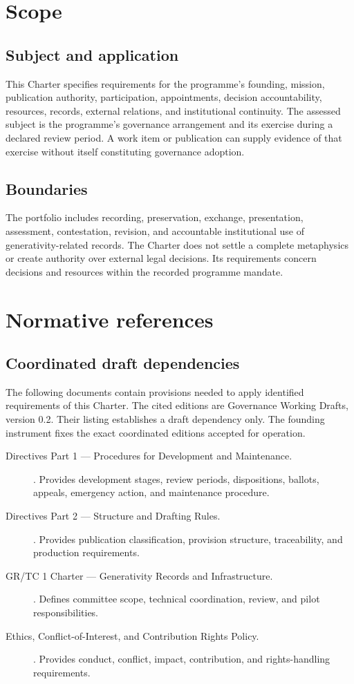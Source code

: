 \documentclass[11pt,a4paper]{article}
\begin{document}
\GSPmainmatter
\section{Scope}
\subsection{Subject and application}
This Charter specifies requirements for the programme's founding, mission, publication authority, participation, appointments, decision accountability, resources, records, external relations, and institutional continuity. The assessed subject is the programme's governance arrangement and its exercise during a declared review period. A work item or publication can supply evidence of that exercise without itself constituting governance adoption.


\subsection{Boundaries}
The portfolio includes recording, preservation, exchange, presentation, assessment, contestation, revision, and accountable institutional use of generativity-related records. The Charter does not settle a complete metaphysics or create authority over external legal decisions. Its requirements concern decisions and resources within the recorded programme mandate.


\section{Normative references}
\subsection{Coordinated draft dependencies}
The following documents contain provisions needed to apply identified requirements of this Charter. The cited editions are Governance Working Drafts, version 0.2. Their listing establishes a draft dependency only. The founding instrument fixes the exact coordinated editions accepted for operation.

\begin{description}
\item[Directives Part 1 --- Procedures for Development and Maintenance.] . Provides development stages, review periods, dispositions, ballots, appeals, emergency action, and maintenance procedure.
\item[Directives Part 2 --- Structure and Drafting Rules.] . Provides publication classification, provision structure, traceability, and production requirements.
\item[GR/TC 1 Charter --- Generativity Records and Infrastructure.] . Defines committee scope, technical coordination, review, and pilot responsibilities.
\item[Ethics, Conflict-of-Interest, and Contribution Rights Policy.] . Provides conduct, conflict, impact, contribution, and rights-handling requirements.
\end{description}
\end{document}
